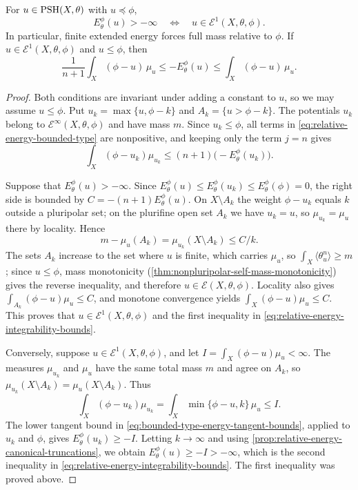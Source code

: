 \begin{theorem}\label{thm:relative-finite-energy-characterization}
For $u\in\mathrm{PSH}(X,\theta)$ with $u\preceq\phi$,
\[
 E_\theta^\phi(u)>-\infty
                    \quad\Longleftrightarrow\quad
                          u\in\mathcal E^1(X,\theta,\phi).
\]
In particular, finite extended energy forces full mass relative to $\phi$. If $u\in\mathcal E^1(X,\theta,\phi)$ and $u\leq\phi$, then
\begin{equation}\label{eq:relative-energy-integrability-bounds}
 \frac1{n+1}\int_X(\phi-u)\,\mu_u
       \leq -E_\theta^\phi(u)
       \leq\int_X(\phi-u)\,\mu_u.
\end{equation}
\end{theorem}
\begin{proof}
Both conditions are invariant under adding a constant to $u$, so we may assume $u\leq\phi$. Put $u_k=\max\{u,\phi-k\}$ and $A_k=\{u>\phi-k\}$. The potentials $u_k$ belong to $\mathcal E^\infty(X,\theta,\phi)$ and have mass $m$. Since $u_k\leq\phi$, all terms in \eqref{eq:relative-energy-bounded-type} are nonpositive, and keeping only the term $j=n$ gives
\[
 \int_X(\phi-u_k)\mu_{u_k}\leq(n+1)\bigl(-E_\theta^\phi(u_k)\bigr).
\]

Suppose that $E_\theta^\phi(u)>-\infty$. Since $E_\theta^\phi(u)\leq E_\theta^\phi(u_k)\leq E_\theta^\phi(\phi)=0$, the right side is bounded by $C=-(n+1)E_\theta^\phi(u)$. On $X\setminus A_k$ the weight $\phi-u_k$ equals $k$ outside a pluripolar set; on the plurifine open set $A_k$ we have $u_k=u$, so $\mu_{u_k}=\mu_u$ there by locality. Hence
\[
 m-\mu_u(A_k)=\mu_{u_k}(X\setminus A_k)\leq C/k.
\]
The sets $A_k$ increase to the set where $u$ is finite, which carries $\mu_u$, so $\int_X\langle\theta_u^n\rangle\geq m$; since $u\leq\phi$, mass monotonicity (\cref{thm:nonpluripolar-self-mass-monotonicity}) gives the reverse inequality, and therefore $u\in\mathcal E(X,\theta,\phi)$. Locality also gives $\int_{A_k}(\phi-u)\mu_u\leq C$, and monotone convergence yields $\int_X(\phi-u)\mu_u\leq C$. This proves that $u\in\mathcal E^1(X,\theta,\phi)$ and the first inequality in \eqref{eq:relative-energy-integrability-bounds}.

Conversely, suppose $u\in\mathcal E^1(X,\theta,\phi)$, and let $I=\int_X(\phi-u)\mu_u<\infty$. The measures $\mu_{u_k}$ and $\mu_u$ have the same total mass $m$ and agree on $A_k$, so $\mu_{u_k}(X\setminus A_k)=\mu_u(X\setminus A_k)$. Thus
\[
 \int_X(\phi-u_k)\mu_{u_k}
      =\int_X\min\{\phi-u,k\}\,\mu_u\leq I.
\]
The lower tangent bound in \eqref{eq:bounded-type-energy-tangent-bounds}, applied to $u_k$ and $\phi$, gives $E_\theta^\phi(u_k)\geq-I$. Letting $k\to\infty$ and using \cref{prop:relative-energy-canonical-truncations}, we obtain $E_\theta^\phi(u)\geq-I>-\infty$, which is the second inequality in \eqref{eq:relative-energy-integrability-bounds}. The first inequality was proved above.
\end{proof}

